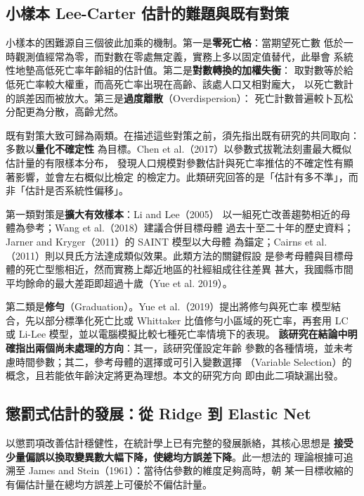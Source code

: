 \documentclass[UTF8, fontset=macnew, a4paper, 12pt]{ctexart}
\begin{document}
\subsection{小樣本 Lee-Carter 估計的難題與既有對策}

小樣本的困難源自三個彼此加乘的機制。第一是\textbf{零死亡格}：當期望死亡數
低於一時觀測值經常為零，而對數在零處無定義，實務上多以固定值替代，此舉會
系統性地墊高低死亡率年齡組的估計值。第二是\textbf{對數轉換的加權失衡}：
取對數等於給低死亡率較大權重，而高死亡率出現在高齡、該處人口又相對龐大，
以死亡數計的誤差因而被放大。第三是\textbf{過度離散}（Overdispersion）：
死亡計數普遍較卜瓦松分配更為分散，高齡尤然。

既有對策大致可歸為兩類。在描述這些對策之前，須先指出既有研究的共同取向：多數以\textbf{量化不確定性}
為目標。Chen et al.（2017）以參數式拔靴法刻畫最大概似估計量的有限樣本分布，
發現人口規模對參數估計與死亡率推估的不確定性有顯著影響，並會左右概似比檢定
的檢定力。此類研究回答的是「估計有多不準」，而非「估計是否系統性偏移」。

第一類對策是\textbf{擴大有效樣本}：Li and Lee（2005）
以一組死亡改善趨勢相近的母體為參考；Wang et al.（2018）建議合併目標母體
過去十至二十年的歷史資料；Jarner and Kryger（2011）的 SAINT 模型以大母體
為錨定；Cairns et al.（2011）則以貝氏方法達成類似效果。此類方法的關鍵假設
是參考母體與目標母體的死亡型態相近，然而實務上鄰近地區的社經組成往往差異
甚大，我國縣市間平均餘命的最大差距即超過十歲（Yue et al. 2019）。

第二類是\textbf{修勻}（Graduation）。Yue et al.（2019）提出將修勻與死亡率
模型結合，先以部分標準化死亡比或 Whittaker 比值修勻小區域的死亡率，再套用
LC 或 Li-Lee 模型，並以電腦模擬比較七種死亡率情境下的表現。
\textbf{該研究在結論中明確指出兩個尚未處理的方向}：其一，該研究僅設定年齡
參數的各種情境，並未考慮時間參數；其二，參考母體的選擇或可引入變數選擇
（Variable Selection）的概念，且若能依年齡決定將更為理想。本文的研究方向
即由此二項缺漏出發。

\subsection{懲罰式估計的發展：從 Ridge 到 Elastic Net}

以懲罰項改善估計穩健性，在統計學上已有完整的發展脈絡，其核心思想是
\textbf{接受少量偏誤以換取變異數大幅下降，使總均方誤差下降}。此一想法的
理論根據可追溯至 James and Stein（1961）：當待估參數的維度足夠高時，朝
某一目標收縮的有偏估計量在總均方誤差上可優於不偏估計量。
\end{document}

